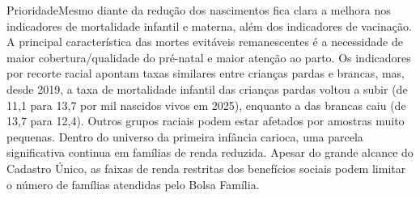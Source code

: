 \begin{sintese}{Prioridade}Mesmo diante da redução dos nascimentos fica clara a melhora nos indicadores de mortalidade infantil e materna, além dos indicadores de vacinação. A principal característica das mortes evitáveis remanescentes é a necessidade de maior cobertura/qualidade do pré-natal e maior atenção ao parto. Os indicadores por recorte racial apontam taxas similares entre crianças pardas e brancas, mas, desde 2019, a taxa de mortalidade infantil das crianças pardas voltou a subir (de 11,1 para 13,7 por mil nascidos vivos em 2025), enquanto a das brancas caiu (de 13,7 para 12,4). Outros grupos raciais podem estar afetados por amostras muito pequenas. Dentro do universo da primeira infância carioca, uma parcela significativa continua em famílias de renda reduzida. Apesar do grande alcance do Cadastro Único, as faixas de renda restritas dos benefícios sociais podem limitar o número de famílias atendidas pelo Bolsa Família.\end{sintese}


